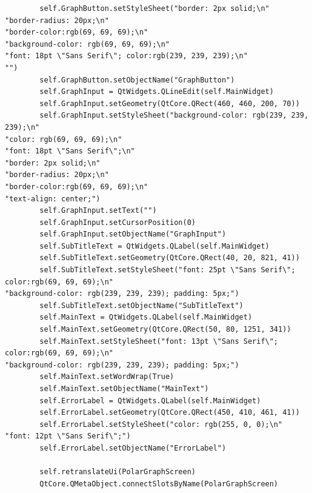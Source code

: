 \documentclass[12pt]{article}
\begin{document}
\begin{lstlisting}
        self.GraphButton.setStyleSheet("border: 2px solid;\n"
"border-radius: 20px;\n"
"border-color:rgb(69, 69, 69);\n"
"background-color: rgb(69, 69, 69);\n"
"font: 18pt \"Sans Serif\"; color:rgb(239, 239, 239);\n"
"")
        self.GraphButton.setObjectName("GraphButton")
        self.GraphInput = QtWidgets.QLineEdit(self.MainWidget)
        self.GraphInput.setGeometry(QtCore.QRect(460, 460, 200, 70))
        self.GraphInput.setStyleSheet("background-color: rgb(239, 239, 239);\n"
"color: rgb(69, 69, 69);\n"
"font: 18pt \"Sans Serif\";\n"
"border: 2px solid;\n"
"border-radius: 20px;\n"
"border-color:rgb(69, 69, 69);\n"
"text-align: center;")
        self.GraphInput.setText("")
        self.GraphInput.setCursorPosition(0)
        self.GraphInput.setObjectName("GraphInput")
        self.SubTitleText = QtWidgets.QLabel(self.MainWidget)
        self.SubTitleText.setGeometry(QtCore.QRect(40, 20, 821, 41))
        self.SubTitleText.setStyleSheet("font: 25pt \"Sans Serif\"; color:rgb(69, 69, 69);\n"
"background-color: rgb(239, 239, 239); padding: 5px;")
        self.SubTitleText.setObjectName("SubTitleText")
        self.MainText = QtWidgets.QLabel(self.MainWidget)
        self.MainText.setGeometry(QtCore.QRect(50, 80, 1251, 341))
        self.MainText.setStyleSheet("font: 13pt \"Sans Serif\"; color:rgb(69, 69, 69);\n"
"background-color: rgb(239, 239, 239); padding: 5px;")
        self.MainText.setWordWrap(True)
        self.MainText.setObjectName("MainText")
        self.ErrorLabel = QtWidgets.QLabel(self.MainWidget)
        self.ErrorLabel.setGeometry(QtCore.QRect(450, 410, 461, 41))
        self.ErrorLabel.setStyleSheet("color: rgb(255, 0, 0);\n"
"font: 12pt \"Sans Serif\";")
        self.ErrorLabel.setObjectName("ErrorLabel")

        self.retranslateUi(PolarGraphScreen)
        QtCore.QMetaObject.connectSlotsByName(PolarGraphScreen)


\end{lstlisting}
\end{document}
